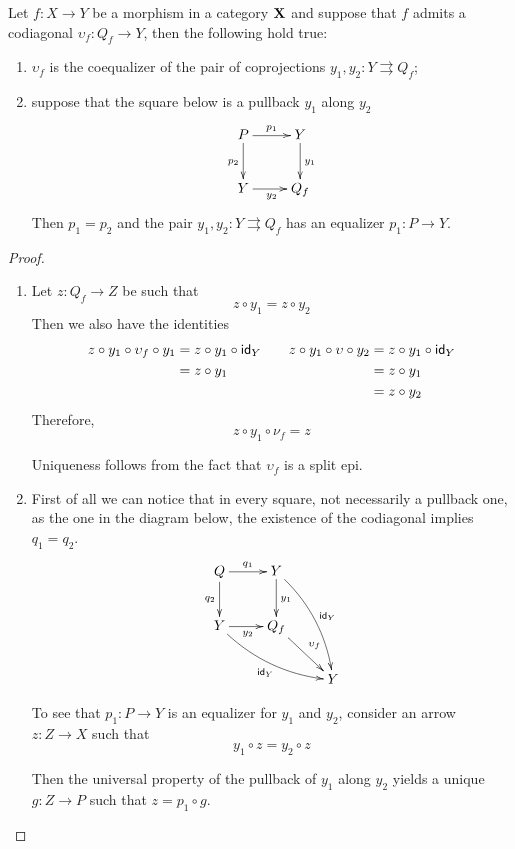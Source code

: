 \begin{lemma}\label{rem:coeq}
	Let $f\colon X\to Y$ be a morphism in a category $\textbf {\textup{X}}$ and suppose that $f$ admits a codiagonal $\upsilon_f\colon Q_f\to Y$, then the following hold true:
	\begin{enumerate}
		\item $\upsilon_f$ is the coequalizer of the pair of coprojections $y_1, y_2\colon Y\rightrightarrows Q_f$;
		\item suppose that the square below is a pullback $y_1$ along $y_2$
		\[\xymatrix{P \ar[r]^{p_1} \ar[d]_{p_2} & Y \ar[d]^{y_1}\\  Y\ar[r]_{y_2} &  Q_f}\]
		Then $p_1=p_2$ and the pair $y_1, y_2\colon Y\rightrightarrows Q_f$ has an equalizer $p_1\colon P\to Y$.
	\end{enumerate}
\end{lemma}
\begin{proof}\begin{enumerate}
		\item  Let $z\colon Q_f\to Z$ be such that
		\[z\circ y_1=z\circ y_2\]
		Then we also have the identities
		\[\begin{split}
			z\circ y_1 \circ \upsilon_f  \circ y_1 &=z\circ y_1 \circ \mathsf{id}_{Y}\\&= z\circ y_1\\&
		\end{split}\qquad \begin{split}z\circ y_1\circ \upsilon \circ  y_2&= z\circ y_1 \circ \mathsf{id}_{Y}\\&=z\circ y_1\\&=z\circ y_2
		\end{split}\]
		Therefore, \[z\circ y_1 \circ \nu_f=z\]	
		
		Uniqueness follows from the fact that $\upsilon_f$ is a split epi.
		\item  First of all we can notice that in every square, not necessarily a pullback one, as the one in the diagram below, the existence of the codiagonal implies $q_1=q_2$.
		\[\xymatrix{Q \ar[r]^{q_1} \ar[d]_{q_2} & Y \ar[d]^{y_1} \ar@/^.3cm/[ddr]^{\id{Y}}\\  Y\ar[r]_{y_2}  \ar@/_.3cm/[drr]_{\id{Y}}&  Q_f\ar[dr]^{\upsilon_f}\\ && Y}\]
		
		To see that $p_1\colon P \to Y$ is an equalizer for $y_1$ and $y_2$, consider an arrow $z\colon Z\to X$ such that
		\[y_1\circ z=y_2\circ z\]
		
		Then the universal property of the pullback of $y_1$ along $y_2$ yields a unique $g\colon Z\to P$ such that $z=p_1\circ g$.
		\qedhere
	\end{enumerate}
\end{proof}


